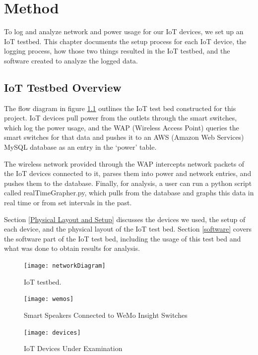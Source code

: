 \chapter{Method}
\label{Method}
To log and analyze network and power usage for our IoT devices, we set up an IoT testbed. This chapter documents the setup process for each IoT device, the logging process, how those two things resulted in the IoT testbed, and the software created to analyze the logged data.

\section{IoT Testbed Overview}
The flow diagram in figure \ref{fig:network} outlines the IoT test bed constructed for this project. IoT devices pull power from the outlets through the smart switches, which log the power usage, and the WAP (Wireless Access Point) queries the smart switches for that data and pushes it to an AWS (Amazon Web Services)\cite{rds} MySQL\cite{mysql} database as an entry in the `power' table.

The wireless network provided through the WAP intercepts network packets of the IoT devices connected to it, parses them into power and network entries, and pushes them to the database. Finally, for analysis, a user can run a python script called realTimeGrapher.py, which pulls from the database and graphs this data in real time or from set intervals in the past.

Section \ref{Physical Layout and Setup} discusses the devices we used, the setup of each device, and the physical layout of the IoT test bed. Section \ref{software} covers the software part of the IoT test bed, including the usage of this test bed and what was done to obtain results for analysis.

\begin{figure}[H]
    \centering
    \texttt{[image: networkDiagram]}
    \caption{IoT testbed.}
    \label{fig:network}
\end{figure}

\begin{figure}[H]
    \centering
    \texttt{[image: wemos]}
    \caption{Smart Speakers Connected to WeMo Insight Switches}
    \label{fig:wemo}
\end{figure}

\begin{figure}[H]
    \centering
    \texttt{[image: devices]}
    \caption{IoT Devices Under Examination}
    \label{fig:devices}
\end{figure}

